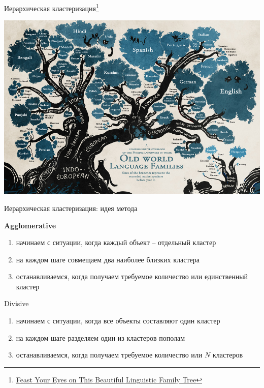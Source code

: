 \documentclass[aspectratio=169]{beamer}
\begin{document}

\begin{frame}

\begin{center}
{\Large Иерархическая кластеризация\footnote{\href{http://mentalfloss.com/article/59665/feast-your-eyes-beautiful-linguistic-family-tree}{Feast Your Eyes on This Beautiful Linguistic Family Tree}}}

\vspace{1em}
\includegraphics[width=0.95\textheight]{images/languages.png}
\end{center}

\end{frame}

\begin{frame}{Иерархическая кластеризация: идея метода}

{\bf Agglomerative}
\begin{enumerate}
\item начинаем с ситуации, когда каждый объект -- отдельный кластер
\item на каждом шаге совмещаем два наиболее близких кластера
\item останавливаемся, когда получаем требуемое количество или единственный кластер
\end{enumerate}

\vspace{1em}
Divisive
\begin{enumerate}
\item начинаем с ситуации, когда все объекты составляют один кластер
\item на каждом шаге разделяем один из кластеров пополам
\item останавливаемся, когда получаем требуемое количество или $N$ кластеров
\end{enumerate}

\end{frame}
\end{document}
